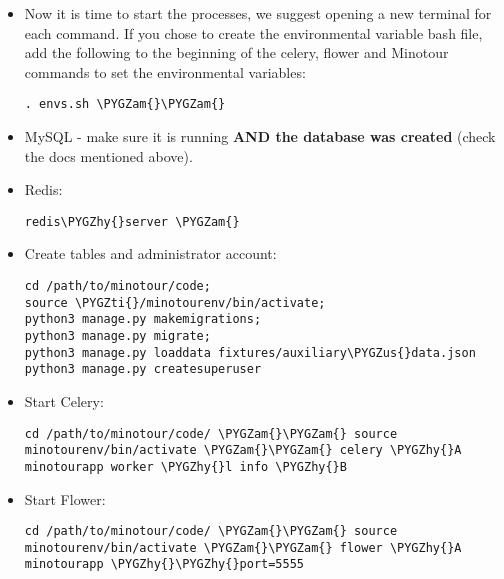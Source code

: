 \documentclass[letterpaper,10pt,english]{sphinxmanual}
\def\PYGZus{\char`\_}
\def\PYGZam{\char`\&}
\def\PYGZhy{\char`\-}
\def\PYGZti{\char`\~}
\begin{document}
\begin{itemize}
\item {} 
Now it is time to start the processes, we suggest opening a new terminal for each command. If you chose to create the environmental variable bash file, add the following to the beginning of the celery, flower and Minotour commands to set the environmental variables:

\begin{Verbatim}[commandchars=\\\{\}]
. envs.sh \PYGZam{}\PYGZam{}
\end{Verbatim}

\item {} 
MySQL - make sure it is running \textbf{AND the database was created} (check the docs mentioned above).

\item {} 
Redis:

\begin{Verbatim}[commandchars=\\\{\}]
redis\PYGZhy{}server \PYGZam{}
\end{Verbatim}

\item {} 
Create tables and administrator account:

\begin{Verbatim}[commandchars=\\\{\}]
cd /path/to/minotour/code;
source \PYGZti{}/minotourenv/bin/activate;
python3 manage.py makemigrations;
python3 manage.py migrate;
python3 manage.py loaddata fixtures/auxiliary\PYGZus{}data.json
python3 manage.py createsuperuser
\end{Verbatim}

\item {} 
Start Celery:

\begin{Verbatim}[commandchars=\\\{\}]
cd /path/to/minotour/code/ \PYGZam{}\PYGZam{} source minotourenv/bin/activate \PYGZam{}\PYGZam{} celery \PYGZhy{}A minotourapp worker \PYGZhy{}l info \PYGZhy{}B
\end{Verbatim}

\item {} 
Start Flower:

\begin{Verbatim}[commandchars=\\\{\}]
cd /path/to/minotour/code/ \PYGZam{}\PYGZam{} source minotourenv/bin/activate \PYGZam{}\PYGZam{} flower \PYGZhy{}A minotourapp \PYGZhy{}\PYGZhy{}port=5555
\end{Verbatim}


\end{itemize}
\end{document}
